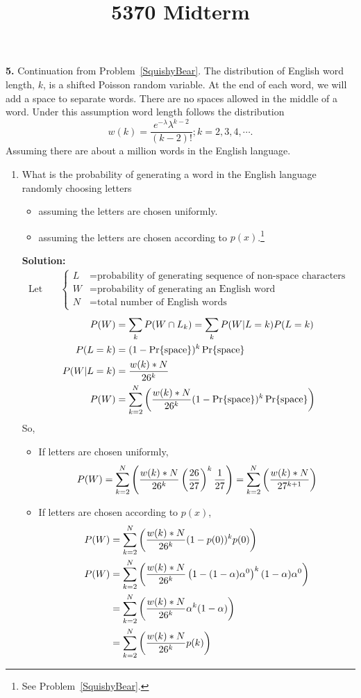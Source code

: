 \documentclass{assignment}
\begin{document}
\title{5370 Midterm}


\textbf{5.} \label{NewToyYoda}
Continuation from Problem~\ref{SquishyBear}.
The distribution of English word length, $k$, is a shifted Poisson random variable. At the end of each word, we will add a space to separate words. There are no spaces allowed in the middle of a word. Under this assumption word length follows the distribution
$$ w(k)=\frac{e^{-\lambda}\lambda^{k-2} }{(k-2)!} ; k=2,3,4,\cdots.$$
Assuming there are about a million words in the English language.
\begin{enumerate}
\item What is the probability of generating a word in the English language randomly choosing letters
  \begin{itemize}
  \item assuming the letters are chosen uniformly.
  \item assuming the letters are chosen according to $p(x)$.\footnote{See Problem~\ref{SquishyBear}.}
  \end{itemize}
  \textbf{Solution:} \\
  \begin{align*}
    \text{Let} \quad & \begin{cases}
      L & = \text{probability of generating sequence of non-space characters} \\
      W & = \text{probability of generating an English word} \\
      N & = \text{total number of English words}
    \end{cases}
  \end{align*}
  \begin{align*}
    P(W) & = \sum_k P(W \cap L_k) = \sum_k P(W|L=k)P(L=k) \\
    P(L=k) & = (1 - \Pr\{\text{space}\})^{k}\Pr\{\text{space}\}\\
    P(W|L=k) & = \dfrac{w(k) * N}{26^k} \\
    P(W) & = \sum_{k=2}^{N} \left(\dfrac{w(k) * N}{26^k} (1 - \Pr\{\text{space}\})^{k}\Pr\{\text{space}\}\right)
  \end{align*}
  So,
  \begin{itemize}
    \item If letters are chosen uniformly,
      $$P(W) = \sum_{k=2}^{N} \left(\dfrac{w(k) * N}{26^k} \left(\dfrac{26}{27}\right)^{k}\dfrac{1}{27}\right)
      = \sum_{k=2}^{N} \left(\dfrac{w(k) * N}{27^{k+1}} \right)$$
    \item If letters are chosen according to $p(x)$,
      \begin{align*}
        P(W) & = \sum_{k=2}^{N} \left(\dfrac{w(k) * N}{26^k} (1 - p(0))^{k}p(0)\right) \\
        P(W) & = \sum_{k=2}^{N} \left(\dfrac{w(k) * N}{26^k}
               \left(1 - (1-\alpha)\alpha^0\right)^{k}(1-\alpha)\alpha^0\right) \\
             & = \sum_{k=2}^{N} \left(\dfrac{w(k) * N}{26^k} \alpha^{k}(1-\alpha)\right) \\
             & = \sum_{k=2}^{N} \left(\dfrac{w(k) * N}{26^k} p(k)\right)
      \end{align*}


\end{itemize}
\end{enumerate}
\end{document}
